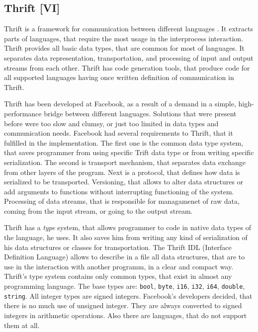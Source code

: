 \subsection{Thrift [VI]}

Thrift is a framework for communication between different languages \cite{Slee2007, Thrift}.
It extracts parts of languages, that require the most usage in the interprocess interaction.
Thrift provides all basic data types, that are common for most of languages.
It separates data representation, transportation, and processing of input and output streams from each other.
Thrift has code generation tools, that produce code for all supported languages having once written definition of communication in Thrift.

Thrift has been developed at Facebook, as a result of a demand in a simple, high-performance bridge between different languages.
Solutions that were present before were too slow and clumsy, or just too limited in data types and communication needs.
Facebook had several requirements to Thrift, that it fulfilled in the implementation.
The first one is the common data type system, that saves programmer from using specific Trift data type or from writing specific serialization.
The second is transport mechanism, that separates data exchange from other layers of the program.
Next is a protocol, that defines how data is serialized to be transported.
Versioning, that allows to alter data structures or add arguments to functions without interrupting functioning of the system.
Processing of data streams, that is responsible for managamenet of raw data, coming from the input stream, or going to the output stream. 

Thrift has a \textit{type}  system, that allows programmer to code in native data types of the language, he uses.
It also saves him from writing any kind of serialization of his data structures or classes for transportation.
The Thrift IDL (Interface Definition Language) allows to describe in a file all data structures, that are to use in the interaction with another programm, in a clear and compact way.
Thrift's type system contains only common types, that exist in almost any programming language.
The base types are: \lstinline{bool}, \lstinline{byte}, \lstinline{i16}, \lstinline{i32}, \lstinline{i64}, \lstinline{double}, \lstinline{string}.
All integer types are signed integers.
Facebook's developers decided, that there is no much use of unsigned integer.
They are always converted to signed integers in arithmetic operations.
Also there are languages, that do not support them at all.

